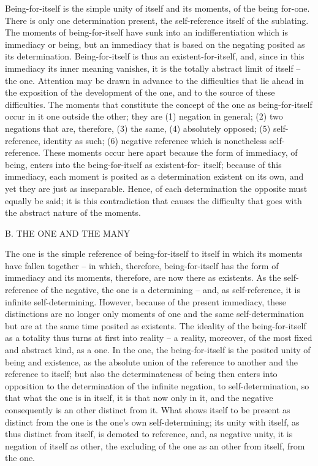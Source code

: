 Being-for-itself is the simple unity of itself and its moments, of the
being for-one. There is only one determination present, the self-reference
itself of the sublating. The moments of being-for-itself have sunk into
an indifferentiation which is immediacy or being, but an immediacy that
is based on the negating posited as its determination. Being-for-itself is
thus an existent-for-itself, and, since in this immediacy its inner meaning
vanishes, it is the totally abstract limit of itself – the one.
Attention may be drawn in advance to the difficulties that lie ahead
in the exposition of the development of the one, and to the source of
these difficulties. The moments that constitute the concept of the one as
being-for-itself occur in it one outside the other; they are (1) negation in
general; (2) two negations that are, therefore, (3) the same, (4) absolutely
opposed; (5) self-reference, identity as such; (6) negative reference which
is nonetheless self-reference. These moments occur here apart because the
form of immediacy, of being, enters into the being-for-itself as existent-for-
itself; because of this immediacy, each moment is posited as a determination
existent on its own, and yet they are just as inseparable. Hence, of each
determination the opposite must equally be said; it is this contradiction
that causes the difficulty that goes with the abstract nature of the moments.

B. THE ONE AND THE MANY

The one is the simple reference of being-for-itself to itself in which its
moments have fallen together – in which, therefore, being-for-itself has the
form of immediacy and its moments, therefore, are now there as existents.
As the self-reference of the negative, the one is a determining – and, as
self-reference, it is infinite self-determining. However, because of the present
immediacy, these distinctions are no longer only moments of one and the
same self-determination but are at the same time posited as existents. The
ideality of the being-for-itself as a totality thus turns at first into reality – a
reality, moreover, of the most fixed and abstract kind, as a one. In the one,
the being-for-itself is the posited unity of being and existence, as the absolute
union of the reference to another and the reference to itself; but also the
determinateness of being then enters into opposition to the determination
of the infinite negation, to self-determination, so that what the one is in
itself, it is that now only in it, and the negative consequently is an other
distinct from it. What shows itself to be present as distinct from the one is
the one’s own self-determining; its unity with itself, as thus distinct from
itself, is demoted to reference, and, as negative unity, it is negation of itself
as other, the excluding of the one as an other from itself, from the one.

